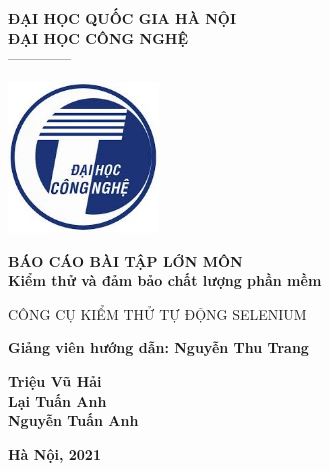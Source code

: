 \documentclass[./main.tex]{subfiles}
\begin{document}
\begin{titlepage}	
	\begin{center}
		\textbf{ĐẠI HỌC QUỐC GIA HÀ NỘI}\\
		\textbf{ĐẠI HỌC CÔNG NGHỆ}\\
		--------------
	
		\vspace*{30pt}
		
		\includegraphics[width=0.3\textwidth]{./images/uet.jpg}
		
		\vspace*{50pt}
		
		\textbf{BÁO CÁO BÀI TẬP LỚN MÔN 
			\\ Kiểm thử và đảm bảo chất lượng phần mềm}
		\vspace*{30pt}
		
		{\Large CÔNG CỤ KIỂM THỬ TỰ ĐỘNG SELENIUM}
		
		\vspace*{50pt}
		
		\textbf{Giảng viên hướng dẫn: Nguyễn Thu Trang}
		
		\vspace*{30pt}
		
		\textbf{Triệu Vũ Hải\\
			Lại Tuấn Anh\\
			Nguyễn Tuấn Anh\\
		}
		
		\vspace*{60pt}
	\end{center}
	
	
	\begin{center}
		\textbf{Hà Nội, 2021}
	\end{center}
\end{titlepage}
\end{document}
